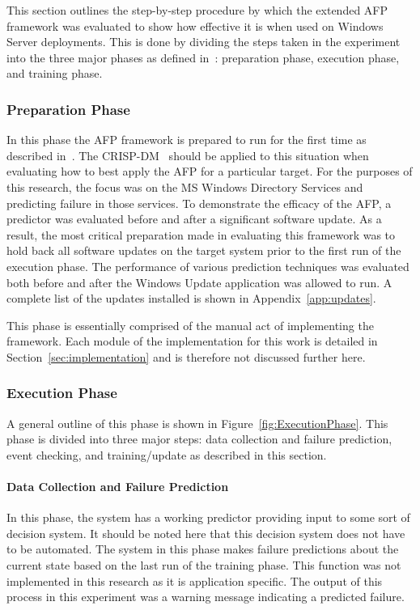 This section outlines the step-by-step procedure by which the extended \ac{AFP}
framework was evaluated to show how effective it is when used on Windows Server
deployments.  This is done by dividing the steps taken in the experiment into
the three major phases as defined in~\cite{irrera2015}: preparation phase,
execution phase, and training phase.

\subsubsection{Preparation Phase}
In this phase the \ac{AFP} framework is prepared to run for the first time as
described in~\cite{irrera2015}.  The \ac{CRISP-DM}~\cite{crispdm} should be
applied to this situation when evaluating how to best apply the \ac{AFP} for a
particular target.  For the purposes of this research, the focus was on the
\ac{MS} Windows Directory Services and predicting failure in those services.
To demonstrate the efficacy of the \ac{AFP}, a predictor was evaluated before
and after a significant software update.  As a result, the most critical
preparation made in evaluating this framework was to hold back all software
updates on the target system prior to the first run of the execution phase.
The performance of various prediction techniques was evaluated both before and
after the Windows Update application was allowed to run.  A complete list of
the updates installed is shown in Appendix~\ref{app:updates}.

This phase is essentially comprised of the manual act of implementing the
framework.  Each module of the implementation for this work is detailed in
Section~\ref{sec:implementation} and is therefore not discussed further here.  

\subsubsection{Execution Phase}
A general outline of this phase is shown in Figure~\ref{fig:ExecutionPhase}.
This phase is divided into three major steps: data collection and failure
prediction, event checking, and training/update as described in this section.

\figExecutionPhase{2.5in}

\paragraph{Data Collection and Failure Prediction}
In this phase, the system has a working predictor providing input to some sort
of decision system.  It should be noted here that this decision system does not
have to be automated.  The system in this phase makes failure predictions about
the current state based on the last run of the training phase.  This function
was not implemented in this research as it is application specific.  The output
of this process in this experiment was a warning message indicating a predicted
failure.

